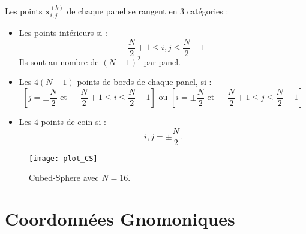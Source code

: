 Les points $\mathbf{x}_{i,j}^{(k)}$ de chaque panel se rangent en 3 catégories :
\begin{itemize}
\item Les points intérieurs si :
\begin{equation}
- \dfrac{N}{2}+1 \leq i,j \leq \dfrac{N}{2}-1
\end{equation}
Ils sont au nombre de $(N-1)^2$ par panel.
\item Les $4(N-1)$ points de bords de chaque panel, si :
\begin{equation}
\left[ j=\pm \dfrac{N}{2} \text{ et } - \dfrac{N}{2}+1 \leq i \leq \dfrac{N}{2}-1 \right] \text{ ou } \left[ i=\pm \dfrac{N}{2} \text{ et } - \dfrac{N}{2}+1 \leq j \leq \dfrac{N}{2}-1 \right]
\end{equation}
\item Les $4$ points de coin si :
\begin{equation}
i, j = \pm \dfrac{N}{2}.
\end{equation}
\end{itemize}



\begin{figure}
\begin{center}
\texttt{[image: plot\_CS]}
\end{center}
\caption{Cubed-Sphere avec $N=16$.}
\end{figure}















\section{Coordonnées Gnomoniques}

